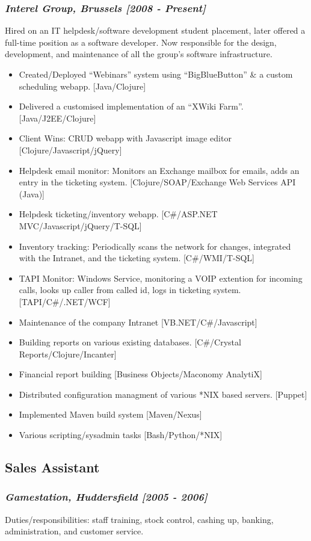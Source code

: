 \documentclass{article}
\begin{document}
\subsubsection*{\emph{Interel Group, Brussels  [2008 - Present]}}
Hired on an IT helpdesk/software development student placement, later offered a full-time position as a software developer. Now responsible for the design, development, and maintenance of all the group's software infrastructure.
\begin{itemize}
\item Created/Deployed ``Webinars'' system using ``BigBlueButton'' \& a custom scheduling webapp. [Java/Clojure]
\item Delivered a customised implementation of an ``XWiki Farm''. [Java/J2EE/Clojure]
\item Client Wins: CRUD webapp with Javascript image editor [Clojure/Javascript/jQuery]
\item Helpdesk email monitor: Monitors an Exchange mailbox for emails, adds an entry in the ticketing system. [Clojure/SOAP/Exchange Web Services API (Java)]
\item Helpdesk ticketing/inventory webapp. [C\#/ASP.NET MVC/Javascript/jQuery/T-SQL]
\item Inventory tracking: Periodically scans the network for changes, integrated with the Intranet, and the ticketing system. [C\#/WMI/T-SQL]
\item TAPI Monitor: Windows Service, monitoring a VOIP extention for incoming calls, looks up caller from called id, logs in ticketing system. [TAPI/C\#/.NET/WCF]
\item Maintenance of the company Intranet [VB.NET/C\#/Javascript]
\item Building reports on various existing databases. [C\#/Crystal Reports/Clojure/Incanter]
\item Financial report building [Business Objects/Maconomy AnalytiX]
\item Distributed configuration managment of various *NIX based servers. [Puppet]
\item Implemented Maven build system [Maven/Nexus]
\item Various scripting/sysadmin tasks [Bash/Python/*NIX]
\end{itemize}
\subsection*{Sales Assistant}
\subsubsection*{\emph{Gamestation, Huddersfield [2005 - 2006]}}
Duties/responsibilities: staff training, stock control, cashing up, banking, administration, and customer service.
\end{document}
